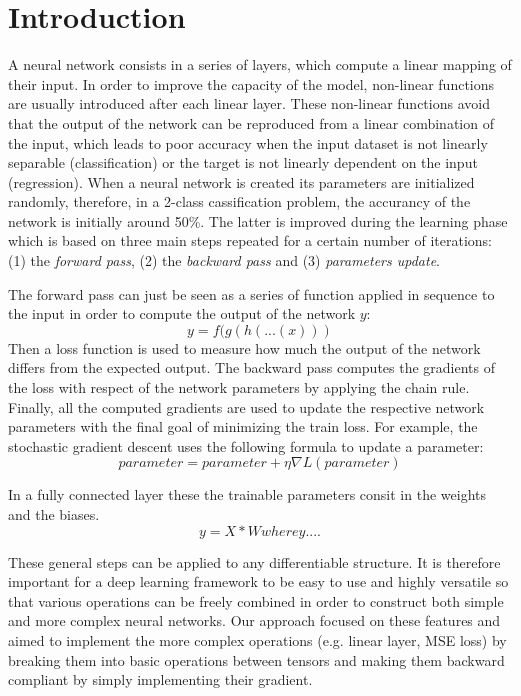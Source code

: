 \documentclass[10pt,conference,compsocconf]{IEEEtran}
\begin{document}
\section{Introduction}
A neural network consists in a series of layers, which compute a linear mapping of their input. In order to improve the capacity of the model, non-linear functions are usually introduced after each linear layer. These non-linear functions avoid that the output of the network can be reproduced from a linear combination of the input, which leads to poor accuracy when the input dataset is not linearly separable (classification) or the target is not linearly dependent on the input (regression).
When a neural network is created its parameters are initialized randomly, therefore, in a 2-class cassification problem, the accurancy of the network is initially around 50\%. The latter is improved during the learning phase which is based on three main steps repeated for a certain number of iterations: (1) the \textit{forward pass}, (2) the \textit{backward pass} and (3) \textit{parameters update}. 
\begin{enumerate}
    \list The forward pass can just be seen as a series of function applied in sequence to the input in order to compute the output of the network $y$:
   \[y = f(g(h(...(x)))\]
    \list Then a loss function is used to measure how much the output of the network differs from the expected output. The backward pass computes the gradients of the loss with respect of the network parameters by applying the chain rule.
    \list Finally, all the computed gradients are used to update the respective network parameters with the final goal of minimizing the train loss. For example, the stochastic gradient descent uses the following formula to update a parameter:
\[parameter = parameter + \eta\nabla L(parameter)\]
\end{enumerate}
In a fully connected layer these the trainable parameters consit in the weights and the biases.
\[y = X*W where y....\]

These general steps can be applied to any differentiable structure. It is therefore important for a deep learning framework to be easy to use and highly versatile so that various operations can be freely combined in order to construct both simple and more complex neural networks. Our approach focused on these features and aimed to implement the more complex operations (e.g. linear layer, MSE loss) by breaking them into basic operations between tensors and making them backward compliant by simply implementing their gradient.
        
\end{document}
